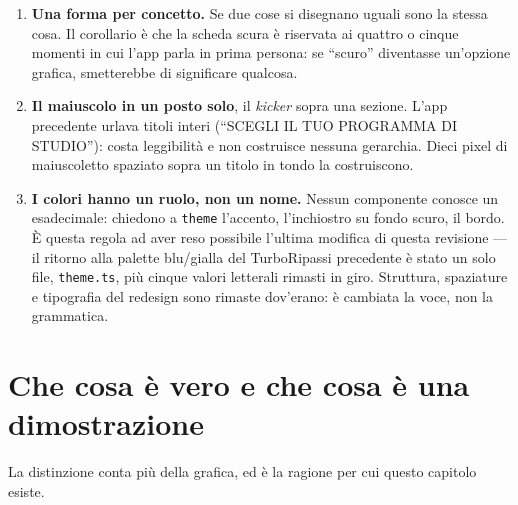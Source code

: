 \documentclass[11pt,a4paper]{report}
\begin{document}
\begin{enumerate}[nosep]
  \item \textbf{Una forma per concetto.} Se due cose si disegnano uguali sono
        la stessa cosa. Il corollario \`e che la scheda scura \`e riservata ai
        quattro o cinque momenti in cui l'app parla in prima persona: se
        ``scuro'' diventasse un'opzione grafica, smetterebbe di significare
        qualcosa.
  \item \textbf{Il maiuscolo in un posto solo}, il \emph{kicker} sopra una
        sezione. L'app precedente urlava titoli interi (``SCEGLI IL TUO
        PROGRAMMA DI STUDIO''): costa leggibilit\`a e non costruisce nessuna
        gerarchia. Dieci pixel di maiuscoletto spaziato sopra un titolo in
        tondo la costruiscono.
  \item \textbf{I colori hanno un ruolo, non un nome.} Nessun componente
        conosce un esadecimale: chiedono a \texttt{theme} l'accento,
        l'inchiostro su fondo scuro, il bordo. \`E questa regola ad aver reso
        possibile l'ultima modifica di questa revisione --- il ritorno alla
        palette blu/gialla del TurboRipassi precedente \`e stato un solo file,
        \texttt{theme.ts}, pi\`u cinque valori letterali rimasti in giro.
        Struttura, spaziature e tipografia del redesign sono rimaste dov'erano:
        \`e cambiata la voce, non la grammatica.
\end{enumerate}

\section{Che cosa \`e vero e che cosa \`e una dimostrazione}

La distinzione conta pi\`u della grafica, ed \`e la ragione per cui questo
capitolo esiste.
\end{document}
